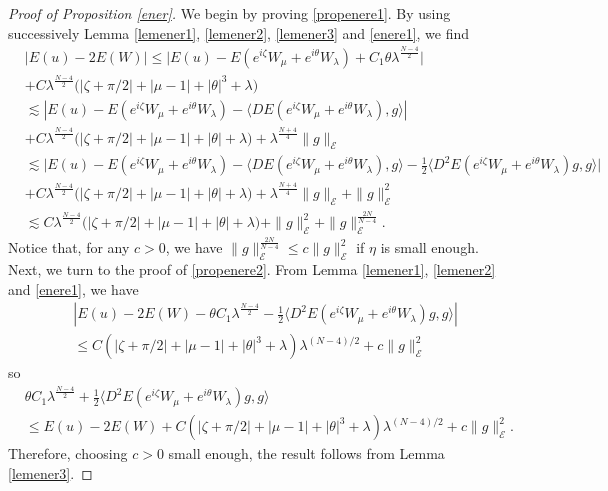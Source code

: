 \documentclass[a4paper,two-side,10pt]{amsart}
\numberwithin{equation}{section}
\begin{document}
\begin{proof}[Proof of Proposition \ref{ener}]
We begin by proving \eqref{propenere1}. By using successively Lemma \ref{lemener1}, \ref{lemener2}, \ref{lemener3} and \eqref{enere1}, we find
\begin{align*}
&|E(u)-2E(W)|\le \big|E(u) - E (e^{i\zeta}W_\mu +e^{i\theta} W_\lambda) + C_1 \theta \lambda^{\frac{N-4}{2}} \big|\\
& +C \lambda^{\frac{N-4}{2}} \big(|\zeta +\pi/2| +|\mu -1| +|\theta|^3 +\lambda\big)\\
&\lesssim  |E(u) - E (e^{i\zeta}W_\mu +e^{i\theta} W_\lambda) - \langle DE (e^{i\zeta}W_\mu +e^{i\theta} W_\lambda),g\rangle | \\
& +C \lambda^{\frac{N-4}{2}} \big(|\zeta +\pi/2| +|\mu -1| +|\theta| +\lambda\big)  +\lambda^{\frac{N+4}{4}}\|g\|_{\mathcal{E}} \\
&\lesssim  \big|E(u) - E (e^{i\zeta}W_\mu +e^{i\theta} W_\lambda) - \langle DE (e^{i\zeta}W_\mu +e^{i\theta} W_\lambda),g\rangle - \tfrac{1}{2}\langle D^2 E (e^{i\zeta}W_\mu +e^{i\theta} W_\lambda )g,g\rangle \big| \\
& +C \lambda^{\frac{N-4}{2}} \big(|\zeta +\pi/2| +|\mu -1| +|\theta| +\lambda\big)  +\lambda^{\frac{N+4}{4}}\|g\|_{\mathcal{E}} +\|g\|_{\mathcal{E}}^2  \\
&\lesssim C \lambda^{\frac{N-4}{2}} \big(|\zeta +\pi/2| +|\mu -1| +|\theta| +\lambda\big) +\|g\|_{\mathcal{E}}^2 +\|g\|_{\mathcal{E}}^{\frac{2N}{N-4}}  .
\end{align*}
Notice that, for any $c>0$, we have $\|g\|_{\mathcal{E}}^{\frac{2N}{N-4}}\leq c \|g\|_{\mathcal{E}}^2$ if $\eta$ is small enough.
Next, we turn to the proof of \eqref{propenere2}. From Lemma \ref{lemener1}, \ref{lemener2} and \eqref{enere1}, we have
\begin{align*}
&|E(u) - 2E(W) -\theta C_1  \lambda^{\frac{N-4}{2}} - \tfrac{1}{2} \langle D^2 E (e^{i\zeta} W_\mu +e^{i\theta} W_\lambda) g,g \rangle |\\
& \leq C (|\zeta + \pi /2|+|\mu -1| +|\theta|^3 +\lambda) \lambda^{(N-4)/2}+c \|g\|_{\mathcal{E}}^2
\end{align*}
so
\begin{align*}
&\theta C_1 \lambda^{\frac{N-4}{2}} +\tfrac{1}{2} \langle D^2 E (e^{i\zeta} W_\mu +e^{i\theta} W_\lambda) g,g \rangle \\
& \leq E(u) - 2E(W) +C (|\zeta + \pi /2|+|\mu -1| +|\theta|^3 +\lambda) \lambda^{(N-4)/2}+c \|g\|_{\mathcal{E}}^2    .
\end{align*}
Therefore, choosing $c>0$ small enough, the result follows from Lemma \ref{lemener3}.
\end{proof}
\end{document}
